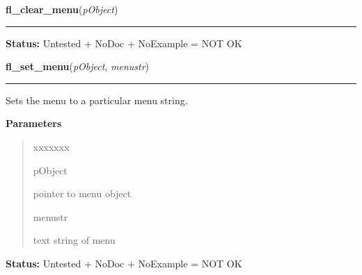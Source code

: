     \label{xformslib:library:fl_clear_menu}

    \vspace{0.5ex}

\hspace{.8\funcindent}\begin{boxedminipage}{\funcwidth}

    \raggedright \textbf{fl\_clear\_menu}(\textit{pObject})

    \vspace{-1.5ex}

    \rule{\textwidth}{0.5\fboxrule}
\setlength{\parskip}{2ex}
\setlength{\parskip}{1ex}
\textbf{Status:} Untested + NoDoc + NoExample = NOT OK



    \end{boxedminipage}

    \label{xformslib:library:fl_set_menu}

    \vspace{0.5ex}

\hspace{.8\funcindent}\begin{boxedminipage}{\funcwidth}

    \raggedright \textbf{fl\_set\_menu}(\textit{pObject}, \textit{menustr})

    \vspace{-1.5ex}

    \rule{\textwidth}{0.5\fboxrule}
\setlength{\parskip}{2ex}
    Sets the menu to a particular menu string.

\setlength{\parskip}{1ex}
      \textbf{Parameters}
      \vspace{-1ex}

      \begin{quote}
        \begin{Ventry}{xxxxxxx}

          \item[pObject]

          pointer to menu object

          \item[menustr]

          text string of menu

        \end{Ventry}

      \end{quote}

\textbf{Status:} Untested + NoDoc + NoExample = NOT OK



    \end{boxedminipage}

